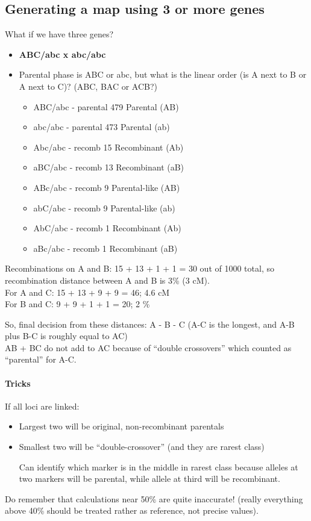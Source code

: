 \documentclass{scrartcl}
\begin{document}
\subsection{Generating a map using 3 or more genes}
\label{sec:3-3}
What if we have three genes?
\begin{itemize}
\item {\bf ABC/abc x abc/abc }
\item Parental phase is ABC or abc, but what is the linear order (is A next to B
  or A next to C)? (ABC, BAC or ACB?)
  \begin{itemize}
  \item ABC/abc - parental 479 Parental (AB)
  \item abc/abc - parental 473 Parental (ab)
  \item Abc/abc - recomb 15 Recombinant (Ab)
  \item aBC/abc - recomb 13 Recombinant (aB)
  \item ABc/abc - recomb 9 Parental-like (AB)
  \item abC/abc - recomb 9 Parental-like (ab)
  \item AbC/abc - recomb 1 Recombinant (Ab)
  \item aBc/abc - recomb 1 Recombinant (aB)
  \end{itemize}
\end{itemize}
Recombinations on A and B: 15 + 13 + 1 + 1 = 30 out of 1000 total, so
recombination distance between A and B is 3\% (3 cM).\\
For A and C: 15 + 13 + 9 + 9 = 46; 4.6 cM\\
For B and C: 9 + 9 + 1 + 1 = 20; 2 \%

So, final decision from these distances: A - B - C (A-C is the longest, and A-B
plus B-C is roughly equal to AC)\\
AB + BC do not add to AC because of ``double crossovers'' which counted as
``parental'' for A-C.

\paragraph{Tricks}

If all loci are linked:
\begin{itemize}
\item Largest two will be original, non-recombinant parentals
\item Smallest two will be ``double-crossover'' (and they are rarest class)

  Can identify which marker is in the middle in rarest class because alleles at
  two markers will be parental, while allele at third will be recombinant.
\end{itemize}
Do remember that calculations near 50\% are quite inaccurate! (really everything
above 40\% should be treated rather as reference, not precise values).
\end{document}
